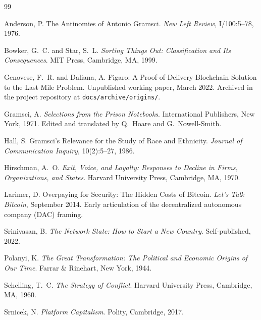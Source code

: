 \documentclass[11pt,a4paper]{article}
\theoremstyle{remark}
\begin{document}
\begin{thebibliography}{99}

Anderson, P.
\newblock The Antinomies of Antonio Gramsci.
\newblock \emph{New Left Review}, I/100:5--78, 1976.

Bowker, G.~C. and Star, S.~L.
\newblock \emph{Sorting Things Out: Classification and Its
  Consequences}.
\newblock MIT Press, Cambridge, MA, 1999.

Genovese, F.~R. and Daliana, A.
\newblock Figaro: A Proof-of-Delivery Blockchain Solution to the
  Last Mile Problem.
\newblock Unpublished working paper, March 2022.
\newblock Archived in the project repository at
  \texttt{docs/archive/origins/}.

Gramsci, A.
\newblock \emph{Selections from the Prison Notebooks}.
\newblock International Publishers, New York, 1971.
\newblock Edited and translated by Q.~Hoare and G.~Nowell-Smith.

Hall, S.
\newblock Gramsci's Relevance for the Study of Race and Ethnicity.
\newblock \emph{Journal of Communication Inquiry}, 10(2):5--27, 1986.

Hirschman, A.~O.
\newblock \emph{Exit, Voice, and Loyalty: Responses to Decline in
  Firms, Organizations, and States}.
\newblock Harvard University Press, Cambridge, MA, 1970.

Larimer, D.
\newblock Overpaying for Security: The Hidden Costs of Bitcoin.
\newblock \emph{Let's Talk Bitcoin}, September 2014.
\newblock Early articulation of the decentralized autonomous
  company (DAC) framing.

Srinivasan, B.
\newblock \emph{The Network State: How to Start a New Country}.
\newblock Self-published, 2022.

Polanyi, K.
\newblock \emph{The Great Transformation: The Political and
  Economic Origins of Our Time}.
\newblock Farrar \& Rinehart, New York, 1944.

Schelling, T.~C.
\newblock \emph{The Strategy of Conflict}.
\newblock Harvard University Press, Cambridge, MA, 1960.

Srnicek, N.
\newblock \emph{Platform Capitalism}.
\newblock Polity, Cambridge, 2017.


\end{thebibliography}
\end{document}
